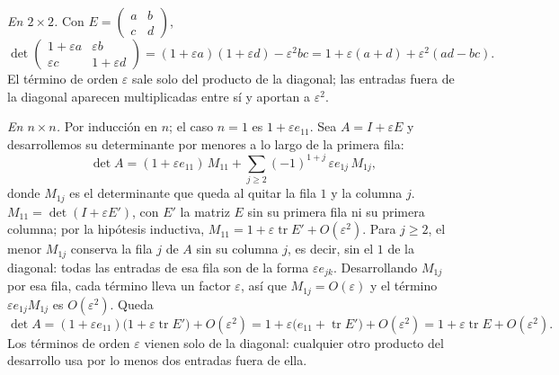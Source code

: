 \begin{demostracion}
\emph{En \(2\times2\).} Con \(E=\left(\begin{smallmatrix}a&b\\c&d\end{smallmatrix}\right)\),
\[
  \det\begin{pmatrix}1+\varepsilon a&\varepsilon b\\ \varepsilon c&1+\varepsilon d\end{pmatrix}
  =(1+\varepsilon a)(1+\varepsilon d)-\varepsilon^2bc
  =1+\varepsilon(a+d)+\varepsilon^2(ad-bc).
\]
El término de orden \(\varepsilon\) sale solo del producto de la diagonal; las entradas
fuera de la diagonal aparecen multiplicadas entre sí y aportan a \(\varepsilon^2\).

\emph{En \(n\times n\).} Por inducción en \(n\); el caso \(n=1\) es
\(1+\varepsilon e_{11}\). Sea \(A=I+\varepsilon E\) y desarrollemos su determinante por
menores a lo largo de la primera fila:
\[
  \det A=(1+\varepsilon e_{11})\,M_{11}+\sum_{j\ge2}(-1)^{1+j}\,\varepsilon e_{1j}\,M_{1j},
\]
donde \(M_{1j}\) es el determinante que queda al quitar la fila \(1\) y la columna \(j\).
\(M_{11}=\det(I+\varepsilon E')\), con \(E'\) la matriz \(E\) sin su primera fila ni su
primera columna; por la hipótesis inductiva, \(M_{11}=1+\varepsilon\operatorname{tr}E'+
O(\varepsilon^2)\). Para \(j\ge2\), el menor \(M_{1j}\) conserva la fila \(j\) de \(A\) sin
su columna \(j\), es decir, sin el \(1\) de la diagonal: todas las entradas de esa fila son
de la forma \(\varepsilon e_{jk}\). Desarrollando \(M_{1j}\) por esa fila, cada término
lleva un factor \(\varepsilon\), así que \(M_{1j}=O(\varepsilon)\) y el término
\(\varepsilon e_{1j}M_{1j}\) es \(O(\varepsilon^2)\). Queda
\[
  \det A=(1+\varepsilon e_{11})\bigl(1+\varepsilon\operatorname{tr}E'\bigr)+O(\varepsilon^2)
  =1+\varepsilon\bigl(e_{11}+\operatorname{tr}E'\bigr)+O(\varepsilon^2)
  =1+\varepsilon\operatorname{tr}E+O(\varepsilon^2).
\]
Los términos de orden \(\varepsilon\) vienen solo de la diagonal: cualquier otro producto
del desarrollo usa por lo menos dos entradas fuera de ella.
\end{demostracion}

